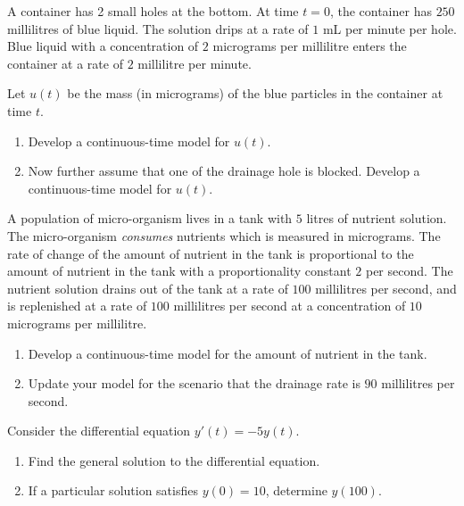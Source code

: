 \documentclass[../main.tex]{subfiles}
\begin{document}
\begin{exercise}
  A container has 2 small holes at the bottom. At time \(t = 0\), the container has \(250\) millilitres of blue liquid. The solution drips at a rate of \(1\) mL per minute per hole. Blue liquid with a concentration of \(2\) micrograms per millilitre enters the container at a rate of \(2\) millilitre per minute.

  Let \(u(t)\) be the mass (in micrograms) of the blue particles in the container at time \(t\).
  \begin{enumerate}
    \item Develop a continuous-time model for \(u(t)\).
    \item Now further assume that one of the drainage hole is blocked. Develop a continuous-time model for \(u(t)\).
  \end{enumerate}
\end{exercise}



\begin{exercise}
  A population of micro-organism lives in a tank with \(5\) litres of nutrient solution. The micro-organism \emph{consumes} nutrients which is measured in micrograms.  The rate of change of the amount of nutrient in the tank is proportional to the amount of nutrient in the tank with a proportionality constant \(2\) per second.  The nutrient solution drains out of the tank at a rate of \(100\) millilitres per second, and is replenished at a rate of \(100\) millilitres per second at a concentration of \(10\) micrograms per millilitre.

  \begin{enumerate}
    \item Develop a continuous-time model for the amount of nutrient in the tank.
    \item Update your model for the scenario that the drainage rate is \(90\) millilitres per second.
  \end{enumerate}
\end{exercise}

\begin{exercise}
  Consider the differential equation \(y'(t) = -5 y(t)\).

  \begin{enumerate}
    \item Find the general solution to the differential equation.
    \item If a particular solution satisfies \(y(0) = 10\), determine \(y(100)\).
  \end{enumerate}
\end{exercise}
\end{document}
